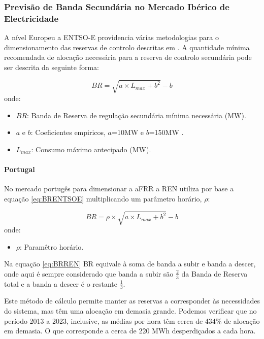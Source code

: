 \subsubsection{Previsão de Banda Secundária no Mercado Ibérico de Electricidade \label{se:pred_mibel}}
A nível Europeu a \gls{ENTSO-E} providencia várias metodologias para o dimensionamento das reservas de controlo descritas em \cite{handbook2009policy}. A quantidade mínima recomendada de alocação necessária para a reserva de controlo secundária pode ser descrita da seguinte forma:\par

\begin{equation} \label{eq:BRENTSOE} 
    BR = \sqrt{a \times  L_{max} + b^{2}} - b 
\end{equation}
onde:
\begin{itemize}
  \item $BR$: Banda de Reserva de regulação secundária mínima necessária (MW).
  \item $a$ e $b$: Coeficientes empiricos, $a$=10MW e $b$=150MW .
  \item $L_{max}$: Consumo máximo antecipado (MW).
\end{itemize}


\paragraph{Portugal \label{se:prev_portugal}}
\text{ }  \par

No mercado portugês para dimensionar a \gls{aFRR} a \gls{REN} utiliza por base a equação \ref{eq:BRENTSOE} multiplicando um parâmetro horário, $\rho$:

\begin{equation} \label{eq:BRREN} 
    BR = \rho \times \sqrt{a \times  L_{max} + b^{2}} - b 
\end{equation}
onde:
\begin{itemize}
  \item $\rho$: Paramêtro horário.
\end{itemize}


Na equação \ref{eq:BRREN} BR equivale à soma de banda a subir e banda a descer, onde aqui é sempre considerado que banda a subir são $\frac{2}{3}$ da Banda de Reserva total e a banda a descer é o restante $\frac{1}{3}$.\par
Este método de cálculo permite manter as reservas a corresponder às necessidades do sistema, mas têm uma alocação em demasia grande. Podemos verificar que no período 2013 a 2023, inclusive, as médias por hora têm cerca de 434\% de alocação em demasia. O que corresponde a cerca de 220 MWh desperdiçados a cada hora. \par

